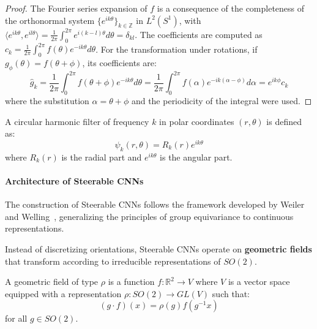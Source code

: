 \begin{proof}
The Fourier series expansion of $f$ is a consequence of the completeness of the orthonormal system $\{e^{ik\theta}\}_{k \in \mathbb{Z}}$ in $L^2(S^1)$, with $\langle e^{ik\theta}, e^{il\theta} \rangle = \frac{1}{2\pi}\int_0^{2\pi} e^{i(k-l)\theta} d\theta = \delta_{kl}$. The coefficients are computed as $c_k = \frac{1}{2\pi}\int_0^{2\pi} f(\theta) e^{-ik\theta} d\theta$. For the transformation under rotations, if $g_\phi(\theta) = f(\theta + \phi)$, its coefficients are:
\[
\hat{g}_k = \frac{1}{2\pi}\int_0^{2\pi} f(\theta + \phi) e^{-ik\theta} d\theta = \frac{1}{2\pi}\int_0^{2\pi} f(\alpha) e^{-ik(\alpha - \phi)} d\alpha = e^{ik\phi} c_k
\]
where the substitution $\alpha = \theta + \phi$ and the periodicity of the integral were used.
\end{proof}

\begin{definition}
A circular harmonic filter of frequency $k$ in polar coordinates $(r, \theta)$ is defined as:
\begin{equation}
\psi_k(r, \theta) = R_k(r) e^{ik\theta}
\end{equation}
where $R_k(r)$ is the radial part and $e^{ik\theta}$ is the angular part.
\end{definition}

\paragraph{Architecture of Steerable CNNs}

The construction of Steerable CNNs follows the framework developed by Weiler and Welling~\citep{weiler2019general}, generalizing the principles of group equivariance to continuous representations.

Instead of discretizing orientations, Steerable CNNs operate on \textbf{geometric fields} that transform according to irreducible representations of $SO(2)$.

\begin{definition}
A geometric field of type $\rho$ is a function $f: \mathbb{R}^2 \to V$ where $V$ is a vector space equipped with a representation $\rho: SO(2) \to GL(V)$ such that:
\begin{equation}
(g \cdot f)(x) = \rho(g) f(g^{-1} x)
\end{equation}
for all $g \in SO(2)$.
\end{definition}

